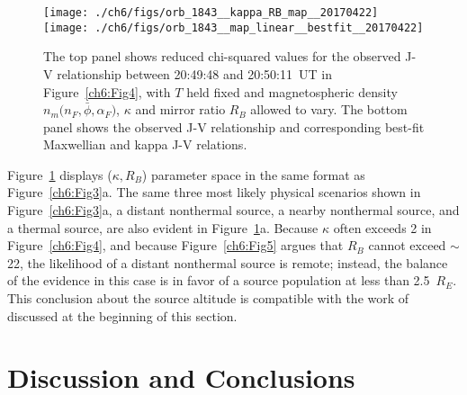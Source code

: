 
  \begin{figure}
    \centering
    \noindent\texttt{[image: ./ch6/figs/orb\_1843\_\_kappa\_RB\_map\_\_20170422]}
    \noindent\texttt{[image: ./ch6/figs/orb\_1843\_\_map\_linear\_\_bestfit\_\_20170422]}
    \caption[Orbit 1843: Reduced chi-squared values for observed J-V curves and
    corresponding best-fit J-V curves.]{The top panel shows reduced chi-squared
      values for the observed J-V relationship between 20:49:48 and 20:50:11~UT
      in Figure~\ref{ch6:Fig4}, with $T$ held fixed and magnetospheric density
      $n_m \big ( n_F, \bar{\phi}, \alpha_F \big )$, $\kappa$ and mirror ratio
      $R_B$ allowed to vary. The bottom panel shows the observed J-V
      relationship and corresponding best-fit Maxwellian and kappa J-V
      relations.}
    \label{ch6:Fig6}
  \end{figure}

  Figure~\ref{ch6:Fig6} displays ($\kappa, R_B$) parameter space in the same
  format as Figure~\ref{ch6:Fig3}a. The same three most likely physical
  scenarios shown in Figure~\ref{ch6:Fig3}a, a distant nonthermal source, a
  nearby nonthermal source, and a thermal source, are also evident in
  Figure~\ref{ch6:Fig6}a. Because $\kappa$ often exceeds 2 in
  Figure~\ref{ch6:Fig4}, and because Figure~\ref{ch6:Fig5} argues that $R_B$
  cannot exceed $\sim$22, the likelihood of a distant nonthermal source is
  remote; instead, the balance of the evidence in this case is in favor of a
  source population at less than 2.5~$R_E$. This conclusion about the source
  altitude is compatible with the work of \citet{Ergun1998} discussed at the
  beginning of this section.
  
  \section{Discussion and Conclusions}

